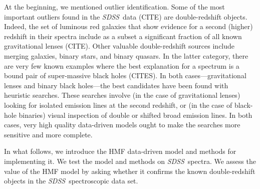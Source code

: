 \documentclass[12pt,preprint]{aastex}
\newcommand{\project}[1]{\textsl{#1}}
\newcommand{\sdss}{\project{SDSS}}
\begin{document}
At the beginning, we mentioned outlier identification.  Some of the
most important outliers found in the \sdss\ data (CITE) are
double-redshift objects.  Indeed, the set of luminous red galaxies
that show evidence for a second (higher) redshift in their spectra
include as a subset a significant fraction of all known gravitational
lenses (CITE).  Other valuable double-redshift sources include merging
galaxies, binary stars, and binary quasars.  In the latter category,
there are very few known examples where the best explanation for a
spectrum is a bound pair of super-massive black holes (CITES).  In both
cases---gravitational lenses and binary black holes---the best
candidates have been found with heuristic searches.  These searches
involve (in the case of gravitational lenses) looking for isolated
emission lines at the second redshift, or (in the case of black-hole
binaries) visual inspection of double or shifted broad emission lines.
In both cases, very high quality data-driven models ought to make the
searches more sensitive and more complete.

In what follows, we introduce the HMF data-driven model and methods
for implementing it.  We test the model and methods on \sdss\ spectra.
We assess the value of the HMF model by asking whether it confirms the
known double-redshift objects in the \sdss\ spectroscopic data set.
\end{document}
